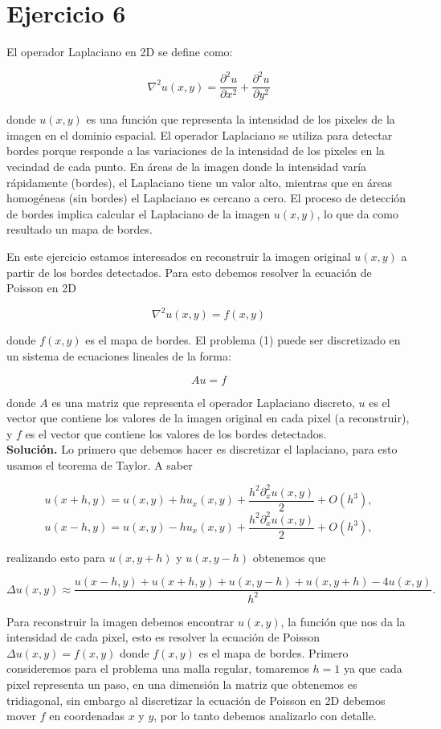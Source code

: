 
\section*{Ejercicio 6}
El operador Laplaciano en 2D se define como:

$$
\nabla^2 u(x, y)=\frac{\partial^2 u}{\partial x^2}+\frac{\partial^2 u}{\partial y^2}
$$

donde $u(x, y)$ es una función que representa la intensidad de los pixeles de la imagen en el dominio espacial. El operador Laplaciano se utiliza para detectar bordes porque responde a las variaciones de la intensidad de los pixeles en la vecindad de cada punto. En áreas de la imagen donde la intensidad varía rápidamente (bordes), el Laplaciano tiene un valor alto, mientras que en áreas homogéneas (sin bordes) el Laplaciano es cercano a cero. El proceso de detección de bordes implica calcular el Laplaciano de la imagen $u(x, y)$, lo que da como resultado un mapa de bordes.

En este ejercicio estamos interesados en reconstruir la imagen original $u(x, y)$ a partir de los bordes detectados. Para esto debemos resolver la ecuación de Poisson en 2D

$$
\nabla^2 u(x, y)=f(x, y)
$$

donde $f(x, y)$ es el mapa de bordes.
El problema (1) puede ser discretizado en un sistema de ecuaciones lineales de la forma:

$$
A u=f
$$

donde $A$ es una matriz que representa el operador Laplaciano discreto, $u$ es el vector que contiene los valores de la imagen original en cada pixel (a reconstruir), y $f$ es el vector que contiene los valores de los bordes detectados.\\

\textbf{Solución.} Lo primero que debemos hacer es  discretizar el laplaciano,  para esto usamos el teorema de Taylor. A saber

    $$u(x+h,y)=u(x,y)+h u_x(x,y)+\frac{h^2\partial^2_{x}u(x,y)}{2}+O(h^3),$$
    $$u(x-h,y)=u(x,y)-h u_x(x,y)+\frac{h^2\partial^2_x u(x,y)}{2}+O(h^3),$$

    realizando esto para $u(x,y+h)$ y $u(x,y-h)$ obtenemos que

    $$\Delta u(x, y) \approx \frac{u(x-h, y)+u(x+h, y)+u(x, y-h)+u(x, y+h)-4 u(x, y)}{h^2}.$$

    Para reconstruir la imagen debemos encontrar $u(x,y)$, la función que nos da la intensidad de cada pixel, esto es resolver la ecuación de  Poisson $\Delta u(x,y)= f(x,y)$ donde $f(x,y)$ es el mapa de bordes. Primero consideremos para el problema una malla regular, tomaremos $h=1$ ya que cada pixel representa un paso, en una  dimensión la matriz que obtenemos es tridiagonal, sin embargo al discretizar la ecuación de Poisson en 2D debemos mover $f$ en coordenadas $x$ y $y$, por lo tanto debemos analizarlo con detalle.\\

